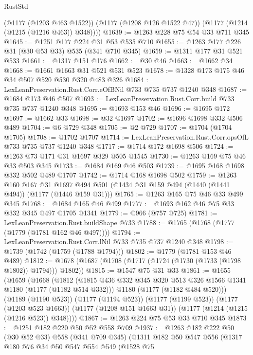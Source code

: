\begin{lexlean}{RustStd}
\begin{coremodule}
{\begin{coremodule}
{{{{{        (@1177 (@1203 @463 @1522))
        (@1177 (@1208 @126 @1522 @47))
        (@1177 (@1214 (@1215 (@1216 @463)) @348))))
@1639 := @1263 @228 @75 @54 @33 @711 @345
@1645 := @1251 @177 @224 @31 @53 @535 @710
@1655 := @1263 @177 @226 @31 (@30 @53 @33) @535 (@341 @710 @345)
@1659 := @1311 @177 @31 @521 @533
@1661 := @1317 @151 @176
@1662 := @30 @46
@1663 := @1662 @34
@1668 := @1661 @1663 @31 @521 @531 @523
@1678 := @1328 @173 @175 @46 @34 @507 @520 @530 @320 @483 @326
@1684 := LexLeanPreservation.Rust.Corr.eOfBNil @733 @735 @737 @1240 @348
@1687 := @1684 @173 @46 @507
@1693 := LexLeanPreservation.Rust.Corr.build @733 @735 @737 @1240 @348
@1695 := @1693 @153 @46
@1696 := @1695 @172
@1697 := @1662 @33
@1698 := @32 @1697
@1702 := @1696 @1698 @332 @506 @489
@1704 := @6 @729 @348
@1705 := @2 @729
@1707 := @1704 (@1704 @1705)
@1708 := @1702 @1707
@1714 := LexLeanPreservation.Rust.Corr.opsOfL @733 @735 @737 @1240 @348
@1717 := @1714 @172 @1698 @506
@1724 := @1263 @73 @171 @31 @1697 @329 @505 @1545
@1730 := @1263 @169 @75 @46 @33 @503 @345
@1733 := @1684 @169 @46 @503
@1739 := @1695 @168 @1698 @332 @502 @489 @1707
@1742 := @1714 @168 @1698 @502
@1759 := @1263
    @160
    @167
    @31
    @1697
    @494
    @501
    (@1434 @31 @159 @494 (@1440 (@1441 @494)) (@1177 (@1446 @159 @31)))
@1765 := @1263 @165 @75 @46 @33 @499 @345
@1768 := @1684 @165 @46 @499
@1777 := @1693 @162 @46 @75 @33 @332 @345 @497 @1705 @1341
@1779 := @966 (@757 @725)
@1781 := LexLeanPreservation.Rust.buildShape @733
@1788 := @1765 (@1768 (@1777 (@1779 (@1781 @162 @46 @497))))
@1794 := LexLeanPreservation.Rust.Corr.lNil @733 @735 @737 @1240 @348
@1798 := @1739 (@1742 (@1759 (@1788 @1794)))
@1802 := @1779 (@1781 @153 @46 @489)
@1812 := @1678 (@1687 (@1708 (@1717 (@1724 (@1730 (@1733 (@1798 @1802)) @1794))) @1802))
@1815 := @1547 @75 @31 @33
@1861 := @1655
    (@1659
      (@1668
        (@1812
          (@1815 @436 @332 @345 @320 @513 @326 @1566 @1341 @1180 (@1177 (@1182 @514 @332)))
          @1180
          (@1177 (@1182 @484 @520)))
        (@1189 (@1190 @523))
        (@1177 (@1194 @523))
        (@1177 (@1199 @523))
        (@1177 (@1203 @523 @1663))
        (@1177 (@1208 @151 @1663 @31))
        (@1177 (@1214 (@1215 (@1216 @523)) @348))))
@1867 := @1263 @224 @75 @53 @33 @710 @345
@1873 := @1251 @182 @220 @50 @52 @558 @709
@1937 := @1263
    @182
    @222
    @50
    (@30 @52 @33)
    @558
    (@341 @709 @345)
    (@1311
      @182
      @50
      @547
      @556
      (@1317
        @180
        @76
        @34
        @50
        @547
        @554
        @549
        (@1528
          @75
}}}}}
\end{coremodule}}
\end{coremodule}
\end{lexlean}
